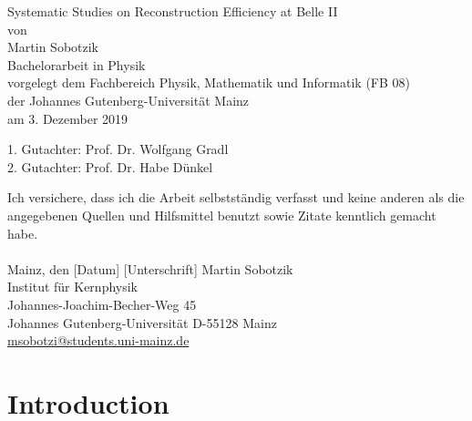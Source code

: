 \documentclass[a4paper,11pt,oneside,final,german,openbib,pdftex]{scrbook}
\begin{document}

\begin{titlepage}
  \vspace*{6mm}
  \begin{center}
     {\afont Systematic Studies on Reconstruction Efficiency at Belle II}
     \\[3.5cm]
     {\large von}
     \\[3.5cm]
     {\dfont Martin Sobotzik}
     \\[2cm]
     {\large Bachelorarbeit in Physik \/\\
        vorgelegt dem Fachbereich Physik, Mathematik und Informatik (FB 08) \/\\
        der Johannes Gutenberg-Universit\"at Mainz \/\\
        am 3. Dezember 2019}
   \end{center}
   \vfill
   1. Gutachter: Prof. Dr. Wolfgang Gradl\\	
   2. Gutachter: Prof. Dr. Habe D\"unkel \\
   \vfill

\end{titlepage}

\thispagestyle{empty}
Ich versichere, dass ich die Arbeit selbstst\"andig verfasst und keine 
anderen als die angegebenen Quellen und Hilfsmittel benutzt sowie 
Zitate kenntlich gemacht habe.
\\
\\[3.5cm] 
Mainz, den [Datum] [Unterschrift]
\vfill
\noindent 
Martin Sobotzik\\
Institut f\"ur Kernphysik\\
Johannes-Joachim-Becher-Weg 45\\
Johannes Gutenberg-Universit\"at
D-55128 Mainz\\
{\href{msobotzi@students.uni-mainz.de}{msobotzi@students.uni-mainz.de}}





\renewcommand\contentsname{Contents}
\renewcommand\figurename{Figure}
\renewcommand\tablename{Table}
\tableofcontents
\clearpage

\mainmatter
\sloppy

\chapter{Introduction}
\label{sec:Introduction}
\end{document}
